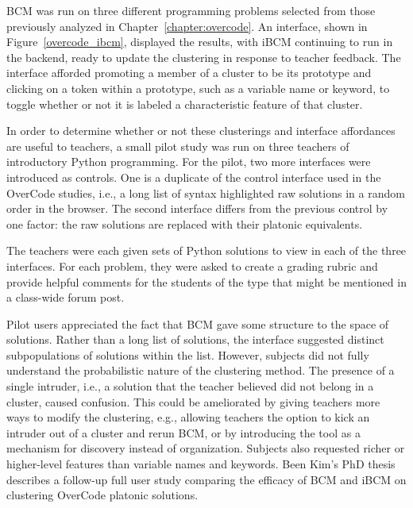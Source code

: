 BCM was run on three different programming problems selected from those previously analyzed in Chapter~\ref{chapter:overcode}. An interface, shown in Figure~\ref{overcode_ibcm}, displayed the results, with iBCM continuing to run in the backend, ready to update the clustering in response to teacher feedback. The interface afforded promoting a member of a cluster to be its prototype and clicking on a token within a prototype, such as a variable name or keyword, to toggle whether or not it is labeled a characteristic feature of that cluster.

In order to determine whether or not these clusterings and interface affordances are useful to teachers, a small pilot study was run on three teachers of introductory Python programming. For the pilot, two more interfaces were introduced as controls. One is a duplicate of the control interface used in the OverCode studies, i.e., a long list of syntax highlighted raw solutions in a random order in the browser. The second interface differs from the previous control by one factor: the raw solutions are replaced with their platonic equivalents.

The teachers were each given sets of Python solutions to view in each of the three interfaces. For each problem, they were asked to create a grading rubric and provide helpful comments for the students of the type that might be mentioned in a class-wide forum post.



Pilot users appreciated the fact that BCM gave some structure to the space of solutions. Rather than a long list of solutions, the interface suggested distinct subpopulations of solutions within the list. However, subjects did not fully understand the probabilistic nature of the clustering method. The presence of a single intruder, i.e., a solution that the teacher believed did not belong in a cluster, caused confusion. This could be ameliorated by giving teachers more ways to modify the clustering, e.g., allowing teachers the option to kick an intruder out of a cluster and rerun BCM, or by introducing the tool as a mechanism for discovery instead of organization. Subjects also requested richer or higher-level features than variable names and keywords. Been Kim's PhD thesis~\cite{beenthesis} describes a follow-up full user study comparing the efficacy of BCM and iBCM on clustering OverCode platonic solutions.

